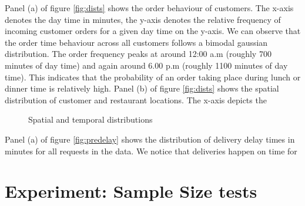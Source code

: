 Panel (a) of figure \ref{fig:dists} shows the order behaviour of customers. The x-axis denotes the day time in minutes, the y-axis denotes the relative frequency of incoming customer orders for a given day time on the y-axis. We can observe that the order time behaviour across all customers follows a bimodal gaussian distribution. The order frequency peaks at around 12:00 a.m (roughly 700 minutes of day time) and again around 6.00 p.m (roughly 1100 minutes of day time). This indicates that the probability of an order taking place during lunch or dinner time is relatively high.  
Panel (b) of figure \ref{fig:dists} shows the spatial distribution of customer and restaurant locations. The x-axis depicts the  

\begin{figure}[h]
	\centering
	\caption{Spatial and temporal distributions}
	\label{fig:prepdelay}
\end{figure}

Panel (a) of figure \ref{fig:predelay} shows the distribution of delivery delay times in minutes for all requests in the data. We notice that deliveries happen on time for 


\section{Experiment: Sample Size tests}\label{sec:samplesize}

